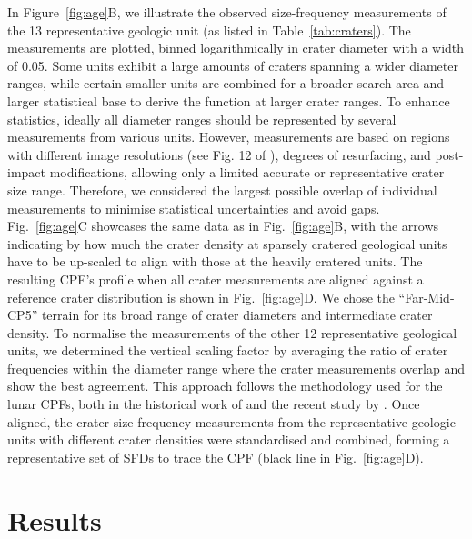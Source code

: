 \documentclass[preprint,11pt,3p,times,authoryear]{elsarticle}
\begin{document}
{In Figure~\ref{fig:age}B, we illustrate the observed size-frequency measurements of the 13 representative geologic unit (as listed in Table~\ref{tab:craters}). The measurements are plotted, binned logarithmically in crater diameter with a width of 0.05.
Some units exhibit a large amounts of craters spanning a wider diameter ranges, while certain smaller units are combined for a broader search area and larger statistical base to derive the function at larger crater ranges. To enhance statistics, ideally all diameter ranges should be represented by several measurements from various units. However, measurements are based on regions with different image resolutions (see Fig. 12 of \citealt{Bland2018}), degrees of resurfacing, and post-impact modifications, allowing only a limited accurate or representative crater size range. Therefore, we considered the largest possible overlap of individual measurements to minimise statistical uncertainties and avoid gaps.\\

Fig.~\ref{fig:age}C showcases the same data as in Fig.~\ref{fig:age}B, with the arrows indicating by how much the crater density at sparsely cratered geological units have to be up-scaled to align with those at the heavily cratered units.
The resulting CPF's profile when all crater measurements are aligned against a reference crater distribution is shown in Fig.~\ref{fig:age}D. We chose the ``Far-Mid-CP5'' terrain for its broad range of crater diameters and intermediate crater density. To normalise the measurements of the other 12 representative geological units, we determined the vertical scaling factor by averaging the ratio of crater frequencies within the diameter range where the crater measurements overlap and show the best agreement.
This approach follows the methodology used for the lunar CPFs, both in the historical work of \citet{Neukum1975} and the recent study by \citet{Xiao2024}. Once aligned, the crater size-frequency measurements from the representative geologic units with different crater densities were standardised and combined, forming a representative set of SFDs to trace the CPF (black line in Fig.~\ref{fig:age}D).\\


\section{Results}

}
\end{document}
